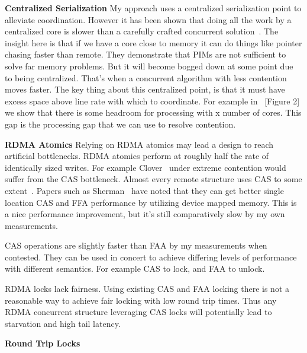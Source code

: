 

\textbf{Centralized Serialization} My approach uses a centralized serialization
point to alleviate coordination. However it has been shown that doing all the
work by a centralized core is slower than a carefully crafted concurrent
solution~\cite{near-memory-structs}. The insight here is that if we have a core
close to memory it can do things like pointer chasing faster than remote. They
demonstrate that PIMs are not sufficient to solve far memory problems. But it
will become bogged down at some point due to being centralized. That's when a
concurrent algorithm with less contention moves faster. The key thing about this
centralized point, is that it must have excess space above line rate with which
to coordinate. For example in ~\cite{fairnic}[Figure 2] we show that there is
some headroom for processing with x number of cores. This gap is the processing
gap that we can use to resolve contention.

\textbf{RDMA Atomics} Relying on RDMA atomics may lead a design to reach
artificial bottlenecks. RDMA atomics perform at roughly half the rate of
identically sized writes. For example Clover~\cite{clover} under extreme
contention would suffer from the CAS bottleneck. Almost every remote structure
uses CAS to some extent~. Papers such as
Sherman~\cite{sherman} have noted that they can get better single location CAS
and FFA performance by utilizing device mapped memory. This is a nice
performance improvement, but it's still comparatively slow by my own
measurements.

CAS operations are slightly faster than FAA by my measurements when contested.
They can be used in concert to achieve differing levels of performance with
different semantics. For example CAS to lock, and FAA to unlock.

RDMA locks lack fairness. Using existing CAS and FAA locking there is not a
reasonable way to achieve fair locking with low round trip times. Thus any RDMA
concurrent structure leveraging CAS locks will potentially lead to starvation
and high tail latency.

\textbf{Round Trip Locks}

